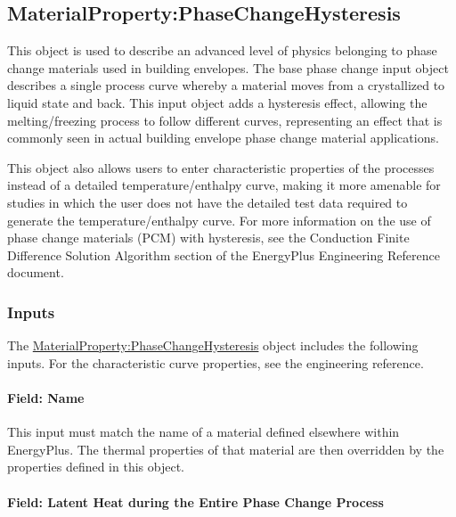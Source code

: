 \subsection{MaterialProperty:PhaseChangeHysteresis}\label{materialpropertyphasechangehysteresis}

This object is used to describe an advanced level of physics belonging to phase change materials used in building envelopes. The base phase change input object describes a single process curve whereby a material moves from a crystallized to liquid state and back. This input object adds a hysteresis effect, allowing the melting/freezing process to follow different curves, representing an effect that is commonly seen in actual building envelope phase change material applications.

This object also allows users to enter characteristic properties of the processes instead of a detailed temperature/enthalpy curve, making it more amenable for studies in which the user does not have the detailed test data required to generate the temperature/enthalpy curve. For more information on the use of phase change materials (PCM) with hysteresis, see the Conduction Finite Difference Solution Algorithm section of the EnergyPlus Engineering Reference document.

\subsubsection{Inputs}\label{materialpropertyphasechangehysteresis-inputs}

The \hyperref[materialpropertyphasechangehysteresis]{MaterialProperty:PhaseChangeHysteresis} object includes the following inputs. For the characteristic curve properties, see the engineering reference.

\paragraph{Field: Name}\label{materialpropertyphasechangehysteresis-name}

This input must match the name of a material defined elsewhere within EnergyPlus. The thermal properties of that material are then overridden by the properties defined in this object.

\paragraph{Field: Latent Heat during the Entire Phase Change Process}\label{materialpropertyphasechangehysteresis-inputs-latent-heat-during-the-entire-phase-change-process}

